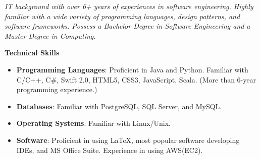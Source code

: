 \documentclass{res}
\newcommand{\resheading}[1]{{\normalsize \colorbox{mygrey}{\begin{minipage}{\textwidth}{\textbf{#1 \vphantom{p\^{E}}}}\end{minipage}}}}
\begin{document}
\begin{resume}
\begin{CJK*}{UTF8}{song}
\normalsize

\vspace*{-0.8cm}
\textit{IT background with over 6+ years of experiences in software engineering. Highly familiar with a wide variety of programming languages, design patterns, and software frameworks. Possess a Bachelor Degree in Software Engineering and a Master Degree in Computing.}

%



%

\resheading{Technical Skills}
\begin{itemize}
\itemsep -2pt %
  \item{\bf Programming Languages}: Proficient in Java and Python. Familiar with C/C++, C\#, Swift 2.0, HTML5, CSS3, JavaScript, Scala. (More than 6-year programming experience.)
  \item{\bf Databases}: Familiar with PostgreSQL, SQL Server, and MySQL.
  \item{\bf Operating Systems}: Familiar with Linux/Unix.
  \item{\bf Software}: Proficient in using \LaTeX, most popular software developing IDEs, and MS Office Suite. Experience in using AWS(EC2).
\end{itemize}



\end{CJK*}
\end{resume}
\end{document}
